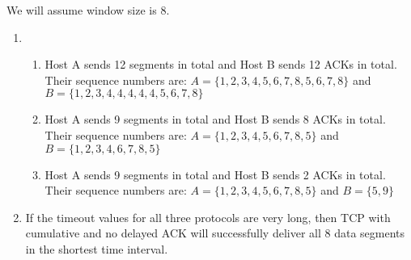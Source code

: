 \documentclass{report}
\begin{document}
\begin{problem}
\begin{answer}{30em}
    We will assume window size is 8.
    \begin{enumerate}
        \item 
            \begin{enumerate}[label=\textit{(\roman*)}]
                \item Host A sends 12 segments in total and Host B sends 12 ACKs in total. Their 
                    sequence numbers are: $A = \{1, 2, 3, 4, 5, 6, 7, 8, 5, 6, 7, 8\}$ and
                    $B = \{1, 2, 3, 4, 4, 4, 4, 4, 5, 6, 7, 8\}$
                \item Host A sends 9 segments in total and Host B sends 8 ACKs in total. Their 
                    sequence numbers are: $A = \{1, 2, 3, 4, 5, 6, 7, 8, 5\}$ and
                    $B = \{1, 2, 3, 4, 6, 7, 8, 5\}$
                \item Host A sends 9 segments in total and Host B sends 2 ACKs in total. Their 
                    sequence numbers are: $A = \{1, 2, 3, 4, 5, 6, 7, 8, 5\}$ and
                    $B = \{5, 9\}$
            \end{enumerate}
        \item If the timeout values for all three protocols are very long, then TCP with cumulative and no delayed
            ACK will successfully deliver all 8 data segments in the shortest time interval.
    \end{enumerate}
\end{answer}
\end{problem}
\end{document}
